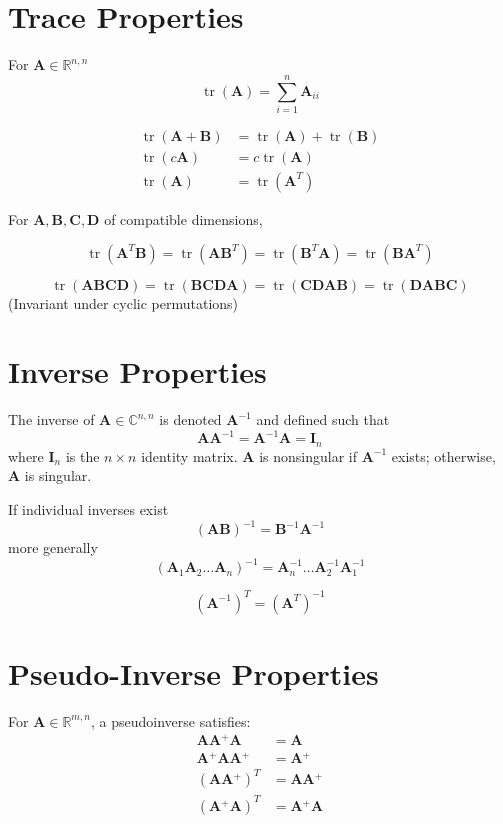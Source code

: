 \documentclass{book}
\newcommand{\mA}{\mathbf{A}}
\newcommand{\mB}{\mathbf{B}}
\newcommand{\mC}{\mathbf{C}}
\newcommand{\mD}{\mathbf{D}}
\newcommand{\mI}{\mathbf{I}}
\DeclareMathOperator{\trace}{tr}
\newcommand{\sCnn}{\mathbb{C}^{n,n}}
\newcommand{\sRmn}{\mathbb{R}^{m,n}}
\newcommand{\sRnn}{\mathbb{R}^{n,n}}
\newcommand{\pinv}{\!^+}
\begin{document}
\chapter{Trace Properties}
For $\mA\in\sRnn$
\begin{equation}
\trace(\mA)=\sum_{i=1}^n \mA_{ii}
\end{equation}

\begin{align}
\trace(\mA+\mB)&=\trace(\mA)+\trace(\mB) \\
\trace(c\mA)   &=c\trace(\mA)            \\
\trace(\mA)    &=\trace(\mA^T)
\end{align}

For $\mA,\mB,\mC,\mD$ of compatible dimensions,

\begin{equation}
\trace(\mA^T\mB)=\trace(\mA\mB^T)=\trace(\mB^T\mA)=\trace(\mB\mA^T)
\end{equation}

\begin{equation}
\trace(\mA\mB\mC\mD)=\trace(\mB\mC\mD\mA)=\trace(\mC\mD\mA\mB)=\trace(\mD\mA\mB\mC)
\end{equation}
(Invariant under cyclic permutations)



\chapter{Inverse Properties}
The inverse of $\mA\in\sCnn$ is denoted $\mA^{-1}$ and defined such that
\begin{equation}
\mA\mA^{-1}=\mA^{-1}\mA=\mI_n
\end{equation}
where $\mI_n$ is the $n \times n$ identity matrix. $\mA$ is nonsingular if $\mA^{-1}$ exists; otherwise, $\mA$ is singular.


If individual inverses exist
\begin{equation}
(\mA\mB)^{-1}=\mB^{-1}\mA^{-1}
\end{equation}
more generally
\begin{equation}
(\mA_1\mA_2\ldots\mA_n)^{-1}=\mA_n^{-1}\ldots\mA_2^{-1}\mA_1^{-1}
\end{equation}

\begin{equation}
(\mA^{-1})^T=(\mA^T)^{-1}
\end{equation}




\chapter{Pseudo-Inverse Properties}
For $\mA\in\sRmn$, a pseudoinverse satisfies:
\begin{align}
\mA\mA\pinv\mA      &= \mA         \\
\mA\pinv\mA\mA\pinv &= \mA\pinv    \\
(\mA\mA\pinv)^T     &= \mA\mA\pinv \\
(\mA\pinv\mA)^T     &= \mA\pinv\mA
\end{align}
\end{document}

